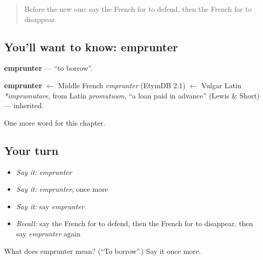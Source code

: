 \begin{quote}
Before the new one: say the French for to defend, then the French for to disappear.
\end{quote}

\subsection*{You'll want to know: emprunter}
\textbf{emprunter} — \textquotedblleft{}to borrow\textquotedblright{}.

\begin{cousinweb}
\textbf{emprunter} $\leftarrow$ Middle French \emph{emprunter} (EtymDB 2.1) $\leftarrow$ Vulgar Latin \emph{*imprumutare}, from Latin \emph{promutuum}, \textquotedblleft{}a loan paid in advance\textquotedblright{} (Lewis \& Short) — inherited.
\end{cousinweb}

\begin{grammarlens}[title={What you've built}]
One more word for this chapter.
\end{grammarlens}

\subsection*{Your turn}
\begin{itemize}
\raggedright
  \item \emph{Say it:} \emph{emprunter}
  \item \emph{Say it:} \emph{emprunter}, once more
  \item \emph{Say it:} say \emph{emprunter}
  \item \emph{Recall:} say the French for to defend, then the French for to disappear, then say \emph{emprunter} again
\end{itemize}

\begin{tcolorbox}[breakable,colback=teal!4,colframe=teal!35!black,title={Before you move on}]
What does emprunter mean? (\textquotedblleft{}To borrow\textquotedblright{}.) Say it once more.
\end{tcolorbox}
